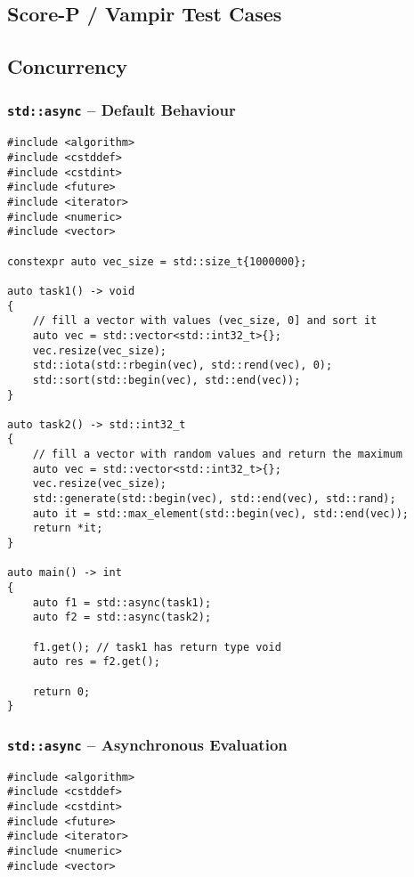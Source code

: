 \begin{appendix}

\section{Score-P / Vampir Test Cases}\label{app:scorep}

\subsection{Concurrency}\label{app:scorep_conc}

\subsubsection{\texttt{std::async} -- Default Behaviour}\label{app:scorep_conc_async_default}

\begin{verbatim}
#include <algorithm>
#include <cstddef>
#include <cstdint>
#include <future>
#include <iterator>
#include <numeric>
#include <vector>

constexpr auto vec_size = std::size_t{1000000};

auto task1() -> void
{
    // fill a vector with values (vec_size, 0] and sort it
    auto vec = std::vector<std::int32_t>{};
    vec.resize(vec_size);
    std::iota(std::rbegin(vec), std::rend(vec), 0);
    std::sort(std::begin(vec), std::end(vec));
}

auto task2() -> std::int32_t
{
    // fill a vector with random values and return the maximum
    auto vec = std::vector<std::int32_t>{};
    vec.resize(vec_size);
    std::generate(std::begin(vec), std::end(vec), std::rand);
    auto it = std::max_element(std::begin(vec), std::end(vec));
    return *it;
}

auto main() -> int
{
    auto f1 = std::async(task1);
    auto f2 = std::async(task2);
    
    f1.get(); // task1 has return type void
    auto res = f2.get();
    
    return 0;
}
\end{verbatim}

\subsubsection{\texttt{std::async} -- Asynchronous Evaluation}\label{app:scorep_conc_async_async}

\begin{verbatim}
#include <algorithm>
#include <cstddef>
#include <cstdint>
#include <future>
#include <iterator>
#include <numeric>
#include <vector>


\end{verbatim}
\end{appendix}
